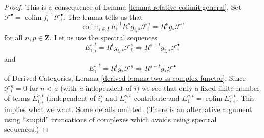 \documentclass[10pt,a4paper]{amsart}
\theoremstyle{plain}
\theoremstyle{definition}
\theoremstyle{remark}
\numberwithin{equation}{subsection}
\def\colim{\mathop{\mathrm{colim}}\nolimits}
\begin{document}
\begin{proof}
This is a consequence of Lemma \ref{lemma-relative-colimit-general}. Set
$\mathcal{F}^\bullet = \colim f_i^{-1}\mathcal{F}_i^\bullet$.
The lemma tells us that
$$
\colim_{i \in I} h_i^{-1}R^pg_{i, *}\mathcal{F}_i^n = R^pg_*\mathcal{F}^n
$$
for all $n, p \in \mathbf{Z}$. Let us use the spectral sequences
$$
E_{1, i}^{s, t} = R^tg_{i, *}\mathcal{F}_i^s \Rightarrow
R^{s + t}g_{i, *}\mathcal{F}_i^\bullet
$$
and
$$
E_1^{s, t} = R^tg_*\mathcal{F}^s \Rightarrow
R^{s + t}g_*\mathcal{F}^\bullet
$$
of Derived Categories, Lemma \ref{derived-lemma-two-ss-complex-functor}.
Since $\mathcal{F}_i^n = 0$ for $n < a$ (with $a$ independent of $i$)
we see that only a fixed finite number of terms $E_{1, i}^{s, t}$
(independent of $i$) and $E_1^{s, t}$ contribute and
$E_1^{s, t} = \colim E_{i, i}^{s, t}$.
This implies what we want. Some details omitted.
(There is an alternative argument using ``stupid'' truncations
of complexes which avoids using spectral sequences.)
\end{proof}
\end{document}
